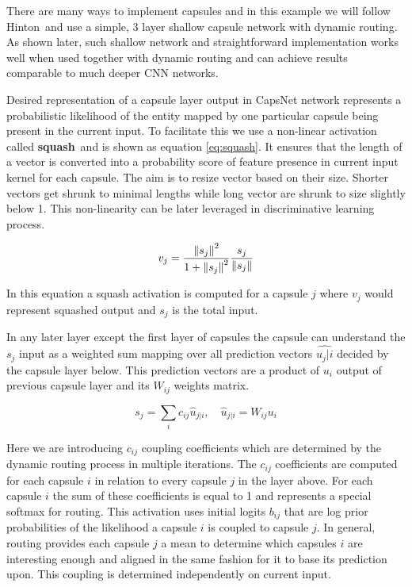 There are many ways to implement capsules and in this example we will follow Hinton\,\cite{capsule} and use a simple, 3 layer shallow capsule network with dynamic routing. As shown later, such shallow network and straightforward implementation works well when used together with dynamic routing and can achieve results comparable to much deeper CNN networks.

Desired representation of a capsule layer output in CapsNet network represents a probabilistic likelihood of the entity mapped by one particular capsule being present in the current input. To facilitate this we use a non-linear activation called \textbf{squash}\ and is shown as equation \ref{eq:squash}. It ensures that the length of a vector is converted into a probability score of feature presence in current input kernel for each capsule. The aim is to resize vector based on their size. Shorter vectors get shrunk to minimal lengths while long vector are shrunk to size slightly below 1. This non-linearity can be later leveraged in discriminative learning process.

\begin{equation}
    v_j = \frac{\left\lVert s_j \right\rVert^2}{1 + \left\lVert s_j \right\rVert^2} \frac{s_j}{\left\lVert s_j \right\rVert}
    \label{eq:squash}
\end{equation}

In this equation a squash activation is computed for a capsule $j$ where $v_j$ would represent squashed output and $s_j$ is the total input.

In any later layer except the first layer of capsules the capsule can understand the $s_j$ input as a weighted sum mapping over all prediction vectors $\hat{u_j|i}$ decided by the capsule layer below. This prediction vectors are a product of $u_i$ output of previous capsule layer and its $W_{ij}$ weights matrix.

\begin{equation}
    s_j = \sum_{i}c_{ij}\hat{u}_{j|i},\quad \hat{u}_{j|i} = W_{ij}u_i
    \label{eq:capsule}
\end{equation}

Here we are introducing $c_{ij}$ coupling coefficients which are determined by the dynamic routing process in multiple iterations. The $c_{ij}$ coefficients are computed for each capsule $i$ in relation to every capsule $j$ in the layer above. For each capsule $i$ the sum of these coefficients is equal to 1 and represents a special softmax for routing. This activation uses initial logits $b_{ij}$ that are log prior probabilities of the likelihood a capsule $i$ is coupled to capsule $j$. In general, routing provides each capsule $j$ a mean to determine which capsules $i$ are interesting enough and aligned in the same fashion for it to base its prediction upon. This coupling is determined independently on current input.

